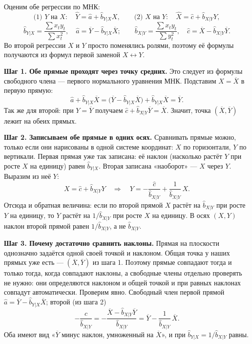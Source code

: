 \begin{solution}
Оценим обе регрессии по МНК:
\[
  \text{(1) } Y \text{ на } X:\quad \widehat{Y} = \widehat{a} + \widehat{b}_{Y|X}X,
  \qquad
  \text{(2) } X \text{ на } Y:\quad \widehat{X} = \widehat{c} + \widehat{b}_{X|Y}Y,
\]
\[
  \widehat{b}_{Y|X} = \frac{\sum x_ty_t}{\sum x_t^2},
  \quad
  \widehat{a} = \overline{Y} - \widehat{b}_{Y|X}\overline{X};
  \qquad
  \widehat{b}_{X|Y} = \frac{\sum x_ty_t}{\sum y_t^2},
  \quad
  \widehat{c} = \overline{X} - \widehat{b}_{X|Y}\overline{Y}.
\]
Во второй регрессии $X$ и $Y$ просто поменялись ролями, поэтому её формулы
получаются из формул первой заменой $X \leftrightarrow Y$.

\medskip
\textbf{Шаг 1. Обе прямые проходят через точку средних.} Это следует из
формулы свободного члена — первого нормального уравнения МНК. Подставим
$X = \overline{X}$ в первую прямую:
\[
  \widehat{a} + \widehat{b}_{Y|X}\overline{X}
  = \bigl(\overline{Y} - \widehat{b}_{Y|X}\overline{X}\bigr) + \widehat{b}_{Y|X}\overline{X}
  = \overline{Y}.
\]
Так же для второй: при $Y = \overline{Y}$ получаем
$\widehat{c} + \widehat{b}_{X|Y}\overline{Y} = \overline{X}$. Значит, точка
$(\overline{X}, \overline{Y})$ лежит на обеих прямых.

\medskip
\textbf{Шаг 2. Записываем обе прямые в одних осях.} Сравнивать прямые можно,
только если они нарисованы в одной системе координат: $X$ по горизонтали, $Y$
по вертикали. Первая прямая уже так записана: её наклон (насколько растёт $Y$
при росте $X$ на единицу) равен $\widehat{b}_{Y|X}$. Вторая записана
«наоборот» — $X$ через $Y$. Выразим из неё $Y$:
\[
  X = \widehat{c} + \widehat{b}_{X|Y}Y
  \quad\Longrightarrow\quad
  Y = -\frac{\widehat{c}}{\widehat{b}_{X|Y}} + \frac{1}{\widehat{b}_{X|Y}}\,X .
\]
Отсюда и обратная величина: если по второй прямой $X$ растёт на
$\widehat{b}_{X|Y}$ при росте $Y$ на единицу, то $Y$ растёт на
$1/\widehat{b}_{X|Y}$ при росте $X$ на единицу. В осях $(X, Y)$ наклон второй
прямой равен $1/\widehat{b}_{X|Y}$, а не $\widehat{b}_{X|Y}$.

\medskip
\textbf{Шаг 3. Почему достаточно сравнить наклоны.} Прямая на плоскости
однозначно задаётся одной своей точкой и наклоном. Общая точка у наших прямых
уже есть — $(\overline{X}, \overline{Y})$ из шага 1. Поэтому прямые совпадают
тогда и только тогда, когда совпадают наклоны, а свободные члены отдельно
проверять не нужно: они определяются наклоном и общей точкой и при равных
наклонах совпадут автоматически. Проверим явно. Свободный член первой прямой
$\widehat{a} = \overline{Y} - \widehat{b}_{Y|X}\overline{X}$; второй (из
шага 2)
\[
  -\frac{\widehat{c}}{\widehat{b}_{X|Y}}
  = -\frac{\overline{X} - \widehat{b}_{X|Y}\overline{Y}}{\widehat{b}_{X|Y}}
  = \overline{Y} - \frac{1}{\widehat{b}_{X|Y}}\,\overline{X}.
\]
Оба имеют вид «$\overline{Y}$ минус наклон, умноженный на $\overline{X}$», и
при $\widehat{b}_{Y|X} = 1/\widehat{b}_{X|Y}$ равны.


\end{solution}
